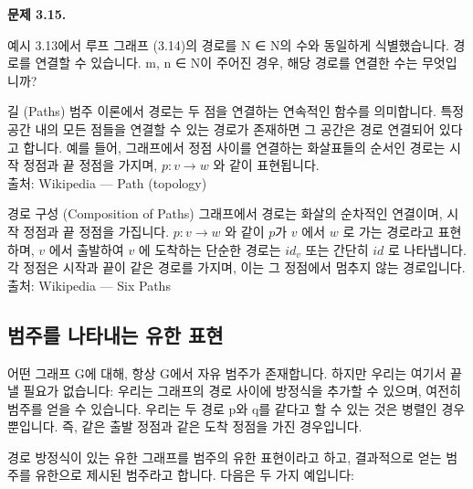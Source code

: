 \documentclass[11pt, a4paper, twoside, openany]{book}
\begin{document}
{\par\medskip
\textbf{문제 3.15.}

\par\medskip
예시 3.13\hspace{0pt}에서 루프 그래프 (3.14)의 경로를 N ∈ N\hspace{0pt}의 수와 동일하게 식별했습니다. 경로를 연결할 수 있습니다. m, n ∈ N\hspace{0pt}이 주어진 경우, 해당 경로를 연결한 수는 무엇입니까?

\begin{deepresearch}{길 (Paths)}
범주 이론에서 경로는 두 점을 연결하는 연속적인 함수를 의미합니다.  특정 공간 내의 모든 점들을 연결할 수 있는 경로가 존재하면 그 공간은 경로 연결되어 있다고 합니다. 예를 들어, 그래프에서 정점 사이를 연결하는 화살표들의 순서인 경로는 시작 정점과 끝 정점을 가지며, $p: v \rightarrow w$ 와 같이 표현됩니다.
\\[4pt]{\footnotesize\color{ctgray} 출처: Wikipedia — Path (topology)}
\end{deepresearch}

\begin{deepresearch}{경로 구성 (Composition of Paths)}
그래프에서 경로는 화살의 순차적인 연결이며, 시작 정점과 끝 정점을 가집니다.  $p : v \rightarrow w$ 와 같이 $p$가 $v$ 에서 $w$ 로 가는 경로라고 표현하며, $v$ 에서 출발하여 $v$ 에 도착하는 단순한 경로는 $id_v$ 또는 간단히 $id$ 로 나타냅니다.  각 정점은 시작과 끝이 같은 경로를 가지며, 이는 그 정점에서 멈추지 않는 경로입니다.
\\[4pt]{\footnotesize\color{ctgray} 출처: Wikipedia — Six Paths}
\end{deepresearch}


\subsection{범주를 나타내는 유한 표현}
\label{sec:3-2-2}

어떤 그래프 G\hspace{0pt}에 대해, 항상 G\hspace{0pt}에서 자유 범주가 존재합니다. 하지만 우리는 여기서 끝낼 필요가 없습니다: 우리는 그래프의 경로 사이에 방정식을 추가할 수 있으며, 여전히 범주를 얻을 수 있습니다. 우리는 두 경로 p\hspace{0pt}와 q\hspace{0pt}를 같다고 할 수 있는 것은 병렬인 경우 뿐입니다. 즉, 같은 출발 정점과 같은 도착 정점을 가진 경우입니다.

\par\medskip
경로 방정식이 있는 유한 그래프를 범주의 유한 표현이라고 하고, 결과적으로 얻는 범주를 유한으로 제시된 범주라고 합니다. 다음은 두 가지 예입니다:

}
\end{document}
